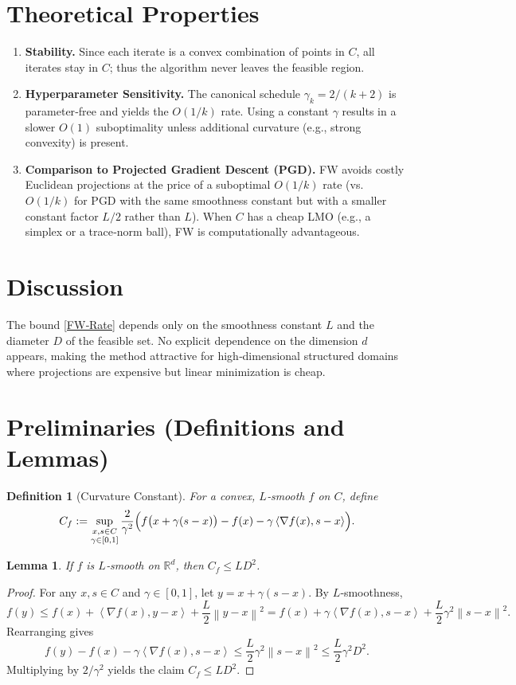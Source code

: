 \documentclass{article}
\newtheorem{lemma}{Lemma}
\newtheorem{definition}{Definition}
\newcommand{\norm}[1]{\left\lVert#1\right\rVert}
\newcommand{\ip}[2]{\left\langle #1,#2\right\rangle}
\begin{document}
\section*{Theoretical Properties}
\begin{enumerate}[label=\arabic*.]
    \item \textbf{Stability.} Since each iterate is a convex combination of points in $C$, all iterates stay in $C$; thus the algorithm never leaves the feasible region.
    \item \textbf{Hyperparameter Sensitivity.} The canonical schedule $\gamma_k=2/(k+2)$ is parameter‑free and yields the $O(1/k)$ rate. Using a constant $\gamma$ results in a slower $O(1)$ suboptimality unless additional curvature (e.g., strong convexity) is present.
    \item \textbf{Comparison to Projected Gradient Descent (PGD).} FW avoids costly Euclidean projections at the price of a suboptimal $O(1/k)$ rate (vs.\ $O(1/k)$ for PGD with the same smoothness constant but with a smaller constant factor $L/2$ rather than $L$). When $C$ has a cheap LMO (e.g., a simplex or a trace‑norm ball), FW is computationally advantageous.
\end{enumerate}

\section*{Discussion}
The bound \eqref{FW‑Rate} depends only on the smoothness constant $L$ and the diameter $D$ of the feasible set. No explicit dependence on the dimension $d$ appears, making the method attractive for high‑dimensional structured domains where projections are expensive but linear minimization is cheap.

\newpage
\section*{Preliminaries (Definitions and Lemmas)}
\begin{definition}[Curvature Constant]\label{def:curvature}
For a convex, $L$‑smooth $f$ on $C$, define
\[
C_f := \sup_{\substack{x,s\in C\\\gamma\in[0,1]}}
\frac{2}{\gamma^2}\Bigl(f\bigl(x+\gamma(s-x)\bigr)-f(x)-\gamma\ip{\nabla f(x)}{s-x}\Bigr).
\]
\end{definition}
\begin{lemma}\label{lem:curvature-bound}
If $f$ is $L$‑smooth on $\mathbb{R}^d$, then $C_f\le LD^2$.
\end{lemma}
\begin{proof}
For any $x,s\in C$ and $\gamma\in[0,1]$, let $y=x+\gamma(s-x)$. By $L$‑smoothness,
\[
f(y)\le f(x)+\ip{\nabla f(x)}{y-x}+\frac{L}{2}\norm{y-x}^2
      =f(x)+\gamma\ip{\nabla f(x)}{s-x}+\frac{L}{2}\gamma^2\norm{s-x}^2 .
\]
Rearranging gives
\[
f(y)-f(x)-\gamma\ip{\nabla f(x)}{s-x}\le\frac{L}{2}\gamma^2\norm{s-x}^2
    \le\frac{L}{2}\gamma^2 D^2 .
\]
Multiplying by $2/\gamma^2$ yields the claim $C_f\le LD^2$.\qedhere
\end{proof}
\end{document}

